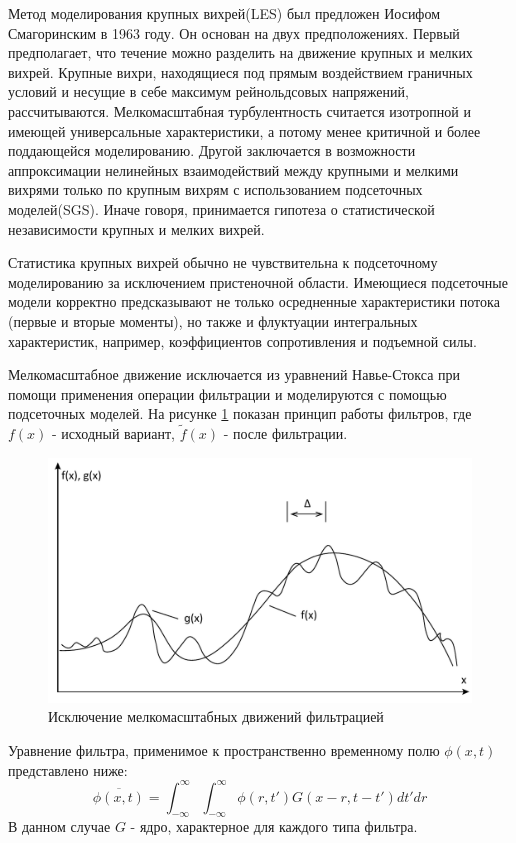 	Метод моделирования крупных вихрей(LES) был предложен Иосифом Смагоринским в 1963 году. Он основан на двух предположениях. Первый предполагает, что течение можно разделить на движение крупных и мелких вихрей. Крупные вихри, находящиеся под прямым воздействием граничных условий и несущие в себе максимум рейнольдсовых напряжений, рассчитываются. Мелкомасштабная турбулентность считается изотропной и имеющей универсальные характеристики, а потому менее критичной и более поддающейся моделированию. Другой  заключается в возможности аппроксимации нелинейных взаимодействий между крупными и мелкими вихрями только по крупным вихрям с использованием подсеточных моделей(SGS). Иначе говоря, принимается гипотеза о статистической независимости крупных и мелких вихрей.
	
	Статистика крупных вихрей обычно не чувствительна к подсеточному моделированию за исключением пристеночной области. Имеющиеся подсеточные модели корректно предсказывают не только осредненные характеристики потока (первые и вторые моменты), но также и флуктуации интегральных характеристик, например, коэффициентов сопротивления и подъемной силы\cite{Fureby2000}.
	
	Мелкомасштабное движение исключается из уравнений Навье-Стокса при помощи применения операции фильтрации и моделируются с помощью подсеточных моделей. На рисунке \ref{fig:lesfilter} показан принцип работы фильтров, где $f(x)$ - исходный вариант, $\tilde{f}(x)$ - после фильтрации.\\
	\begin{figure}[H]
		\centering
		\includegraphics[width=0.7\linewidth]{../Assets/ФильтрацияLES}
		\caption{Исключение мелкомасштабных движений фильтрацией}
		\label{fig:lesfilter}
	\end{figure}
	
	Уравнение фильтра, применимое к пространственно временному полю $\phi(x,t)$ представлено ниже:
	\begin{equation}
		\overline{\phi(x,t)} = \int_{-\infty}^{\infty}\int_{-\infty}^{\infty}\phi(r,t')G(x - r, t - t')dt'dr
	\end{equation}
	В данном случае $G$ - ядро, характерное для каждого типа фильтра.
	
